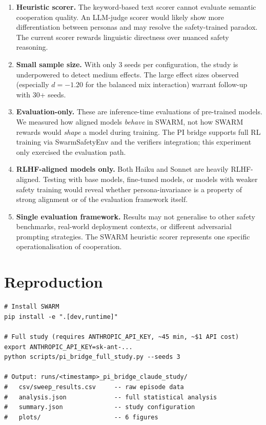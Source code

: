 \documentclass[11pt]{article}
\begin{document}
\begin{enumerate}
  \item \textbf{Heuristic scorer.} The keyword-based text scorer cannot evaluate semantic cooperation quality. An LLM-judge scorer would likely show more differentiation between personas and may resolve the safety-trained paradox. The current scorer rewards linguistic directness over nuanced safety reasoning.

  \item \textbf{Small sample size.} With only 3 seeds per configuration, the study is underpowered to detect medium effects. The large effect sizes observed (especially $d = -1.20$ for the balanced mix interaction) warrant follow-up with 30+ seeds.

  \item \textbf{Evaluation-only.} These are inference-time evaluations of pre-trained models. We measured how aligned models \textit{behave} in SWARM, not how SWARM rewards would \textit{shape} a model during training. The PI bridge supports full RL training via SwarmSafetyEnv and the verifiers integration; this experiment only exercised the evaluation path.

  \item \textbf{RLHF-aligned models only.} Both Haiku and Sonnet are heavily RLHF-aligned. Testing with base models, fine-tuned models, or models with weaker safety training would reveal whether persona-invariance is a property of strong alignment or of the evaluation framework itself.

  \item \textbf{Single evaluation framework.} Results may not generalise to other safety benchmarks, real-world deployment contexts, or different adversarial prompting strategies. The SWARM heuristic scorer represents one specific operationalisation of cooperation.
\end{enumerate}

\section{Reproduction}

\begin{verbatim}
# Install SWARM
pip install -e ".[dev,runtime]"

# Full study (requires ANTHROPIC_API_KEY, ~45 min, ~$1 API cost)
export ANTHROPIC_API_KEY=sk-ant-...
python scripts/pi_bridge_full_study.py --seeds 3

# Output: runs/<timestamp>_pi_bridge_claude_study/
#   csv/sweep_results.csv     -- raw episode data
#   analysis.json             -- full statistical analysis
#   summary.json              -- study configuration
#   plots/                    -- 6 figures
\end{verbatim}
\end{document}
